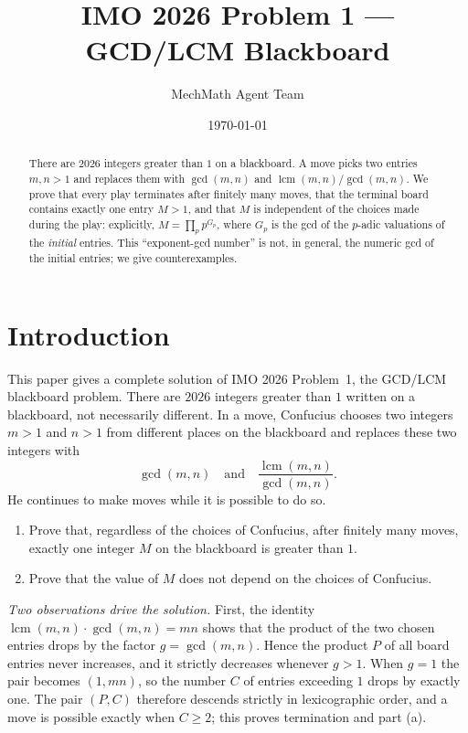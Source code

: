 \documentclass{article}
\title{IMO 2026 Problem 1 --- GCD/LCM Blackboard}
\author{MechMath Agent Team}
\date{\today}
\DeclareMathOperator{\lcm}{lcm}
\begin{document}
\maketitle

\begin{abstract}
There are $2026$ integers greater than $1$ on a blackboard. A move picks two
entries $m,n>1$ and replaces them with $\gcd(m,n)$ and
$\lcm(m,n)/\gcd(m,n)$. We prove that every play terminates after finitely many
moves, that the terminal board contains exactly one entry $M>1$, and that $M$
is independent of the choices made during the play: explicitly,
$M=\prod_p p^{G_p}$, where $G_p$ is the gcd of the $p$-adic valuations of the
\emph{initial} entries. This ``exponent-gcd number'' is not, in general, the
numeric gcd of the initial entries; we give counterexamples.
\end{abstract}

\section{Introduction}

This paper gives a complete solution of IMO 2026 Problem~1, the GCD/LCM
blackboard problem. There are $2026$ integers greater than $1$ written on a
blackboard, not necessarily different. In a move, Confucius chooses two
integers $m>1$ and $n>1$ from different places on the blackboard and replaces
these two integers with
\[
\gcd(m,n) \quad\text{and}\quad \frac{\lcm(m,n)}{\gcd(m,n)}.
\]
He continues to make moves while it is possible to do so.

\begin{enumerate}
\item[(a)] Prove that, regardless of the choices of Confucius, after finitely
           many moves, exactly one integer $M$ on the blackboard is greater
           than $1$.
\item[(b)] Prove that the value of $M$ does not depend on the choices of
           Confucius.
\end{enumerate}

\emph{Two observations drive the solution.} First, the identity
$\lcm(m,n)\cdot\gcd(m,n)=mn$ shows that the product of the two chosen entries
drops by the factor $g=\gcd(m,n)$. Hence the product $P$ of all board entries
never increases, and it strictly decreases whenever $g>1$. When $g=1$ the pair
becomes $(1,mn)$, so the number $C$ of entries exceeding $1$ drops by exactly
one. The pair $(P,C)$ therefore descends strictly in lexicographic order, and a
move is possible exactly when $C\geq 2$; this proves termination and part (a).
\end{document}
